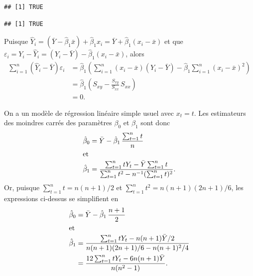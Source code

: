 \begin{solution}{2.3}
\begin{enumerate}
\begin{knitrout}
\begin{kframe}
\begin{alltt}
 \hlopt{+} 
\end{alltt}
\begin{verbatim}
## [1] TRUE
\end{verbatim}
\begin{alltt}
\hlstd{(}\hlopt{$}\hlopt{/}
\end{alltt}
\begin{verbatim}
## [1] TRUE
\end{verbatim}
\end{kframe}
\end{knitrout}
    \end{enumerate}
  
\end{solution}
\begin{solution}{2.4}
    Puisque $\hat{Y}_i = (\bar{Y} - \hat{\beta}_1 \bar{x}) +
    \hat{\beta}_1 x_i = \bar{Y} + \hat{\beta}_1 (x_i - \bar{x})$ et
    que $\varepsilon_i = Y_i - \hat{Y}_i = (Y_i - \bar{Y}) - \hat{\beta}_1 (x_i
    - \bar{x})$, alors
    \begin{align*}
      \sum_{i = 1}^n (\hat{Y}_i - \bar{Y}) \varepsilon_i
      &= \hat{\beta}_1
      \left(
        \sum_{i=1}^n (x_i - \bar{x})(Y_i - \bar{Y}) -
        \hat{\beta}_1 \sum_{i = 1}^n (x_i - \bar{x})^2
      \right) \\
      & = \hat{\beta}_1
      \left(
        S_{xy} - \frac{S_{xy}}{S_{xx}}\, S_{xx}
      \right) \\
      & = 0.
    \end{align*}
  
\end{solution}
\begin{solution}{2.5}
    On a un modèle de régression linéaire simple usuel avec $x_t =
    t$. Les estimateurs des moindres carrés des paramètres $\beta_0$ et
    $\beta_1$ sont donc
    \begin{align*}
      \hat{\beta}_0
      &= \bar{Y} - \hat{\beta}_1\, \frac{\sum_{t = 1}^n t}{n} \\
      \intertext{et}
      \hat{\beta}_1
      &= \frac{\sum_{t = 1}^n t Y_t - \bar{Y} \sum_{t = 1}^n t}{\sum_{t
          = 1}^n t^2 - n^{-1} (\sum_{t = 1}^n t)^2}.
    \end{align*}
    Or, puisque $\sum_{t = 1}^n t = n(n + 1)/2$ et $\sum_{t = 1}^n t^2
    = n(n + 1)(2n + 1)/6$, les expressions ci-dessus se simplifient en
    \begin{align*}
      \hat{\beta}_0
      & = \bar{Y} - \hat{\beta}_1\, \frac{n + 1}{2} \\
      \intertext{et}
      \hat{\beta}_1
      & = \frac{\sum_{t=1}^n t Y_t - n(n + 1) \bar{Y}/2}{n(n + 1)(2n +
        1)/6 - n(n + 1)^2/4} \\
      & = \frac{12 \sum_{t=1}^n t Y_t - 6 n (n + 1) \bar{Y}}{n (n^2 - 1)}.
    \end{align*}
  
\end{solution}
